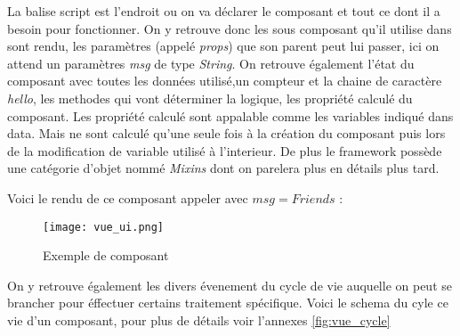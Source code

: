 La balise script est l'endroit ou on va déclarer le composant et tout ce dont il a besoin pour fonctionner. On y retrouve donc les sous composant qu'il utilise dans sont rendu, les paramètres (appelé \textit{props}) que son parent peut lui passer, ici on attend un paramètres \textit{msg} de type \textit{String}. On retrouve également l'état du composant avec toutes les données utilisé,un compteur et la chaine de caractère \textit{hello}, les methodes qui vont déterminer la logique, les propriété calculé du composant. Les propriété calculé sont appalable comme les variables indiqué dans data. Mais ne sont calculé qu'une seule fois à la création du composant puis lors de la modification de variable utilisé à l'interieur. 
De plus le framework possède une catégorie d'objet nommé \textit{Mixins} dont on parelera plus en détails plus tard.

Voici le rendu de ce composant appeler avec $msg = Friends$ :
\begin{figure}[htbp]
    \center
    \texttt{[image: vue\_ui.png]}
    \caption{Exemple de composant}
    
\end{figure}

On y retrouve également les divers évenement du cycle de vie auquelle on  peut se brancher pour éffectuer certains traitement spécifique. Voici le schema du cyle ce vie d'un composant, pour plus de détails voir l'annexes \ref{fig:vue_cycle}


